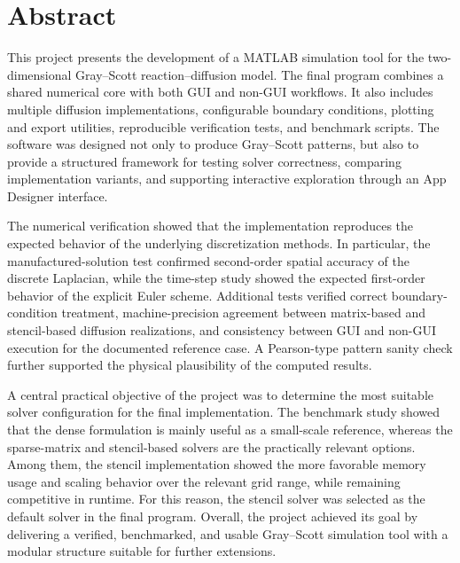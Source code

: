 \chapter*{Abstract}

\begin{sloppypar}
This project presents the development of a MATLAB simulation tool for the two-dimensional Gray--Scott reaction--diffusion model. The final program combines a shared numerical core with both GUI and non-GUI workflows. It also includes multiple diffusion implementations, configurable boundary conditions, plotting and export utilities, reproducible verification tests, and benchmark scripts. The software was designed not only to produce Gray--Scott patterns, but also to provide a structured framework for testing solver correctness, comparing implementation variants, and supporting interactive exploration through an App Designer interface.

The numerical verification showed that the implementation reproduces the expected behavior of the underlying discretization methods. In particular, the manufactured-solution test confirmed second-order spatial accuracy of the discrete Laplacian, while the time-step study showed the expected first-order behavior of the explicit Euler scheme. Additional tests verified correct boundary-condition treatment, machine-precision agreement between matrix-based and stencil-based diffusion realizations, and consistency between GUI and non-GUI execution for the documented reference case. A Pearson-type pattern sanity check further supported the physical plausibility of the computed results.

A central practical objective of the project was to determine the most suitable solver configuration for the final implementation. The benchmark study showed that the dense formulation is mainly useful as a small-scale reference, whereas the sparse-matrix and stencil-based solvers are the practically relevant options. Among them, the stencil implementation showed the more favorable memory usage and scaling behavior over the relevant grid range, while remaining competitive in runtime. For this reason, the stencil solver was selected as the default solver in the final program. Overall, the project achieved its goal by delivering a verified, benchmarked, and usable Gray--Scott simulation tool with a modular structure suitable for further extensions.
\end{sloppypar}
